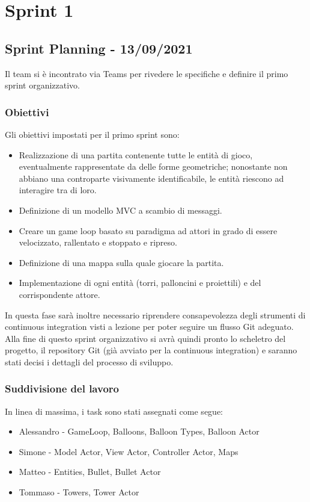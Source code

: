 \section{Sprint 1}
\subsection{Sprint Planning - 13/09/2021}
Il team si è incontrato via Teams per rivedere le specifiche e definire il primo sprint organizzativo.

\subsubsection{Obiettivi}
Gli obiettivi impostati per il primo sprint sono:
\begin{itemize}
    \item Realizzazione di una partita contenente tutte le entità di gioco, eventualmente rappresentate da delle forme geometriche; nonostante non abbiano una controparte visivamente identificabile, le entità riescono ad interagire tra di loro.
    \item Definizione di un modello MVC a scambio di messaggi.
    \item Creare un game loop basato su paradigma ad attori in grado di essere velocizzato, rallentato e stoppato e ripreso.
    \item Definizione di una mappa sulla quale giocare la partita.
    \item Implementazione di ogni entità (torri, palloncini e proiettili) e del corrispondente attore.
\end{itemize}
In questa fase sarà inoltre necessario riprendere consapevolezza degli strumenti di continuous integration visti a
lezione per poter seguire un flusso Git adeguato. Alla fine di questo sprint organizzativo si avrà quindi pronto lo
scheletro del progetto, il repository Git (già avviato per la continuous integration) e saranno stati decisi i
dettagli del processo di sviluppo.

\subsubsection{Suddivisione del lavoro}
In linea di massima, i task sono stati assegnati come segue:
\begin{itemize}
    \item Alessandro - GameLoop, Balloons, Balloon Types, Balloon Actor
    \item Simone - Model Actor, View Actor, Controller Actor, Maps
    \item Matteo - Entities, Bullet, Bullet Actor
    \item Tommaso - Towers, Tower Actor
\end{itemize}

